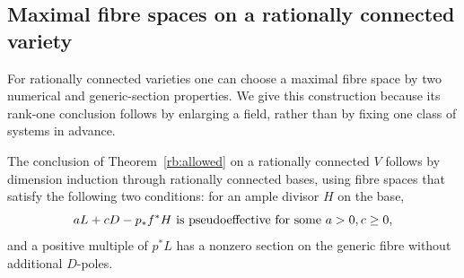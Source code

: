 \subsection{Maximal fibre spaces on a rationally connected variety}
\label{rb:max-fibration}

For rationally connected varieties one can choose a maximal fibre
space by two numerical and generic-section properties.  We give this
construction because its rank-one conclusion follows by enlarging a
field, rather than by fixing one class of systems in advance.

\begin{proposition}\label{rb:rc-method}
The conclusion of Theorem~\ref{rb:allowed} on a rationally connected
$V$ follows by dimension induction through rationally connected
bases, using fibre spaces that satisfy the following two conditions:
for an ample divisor $H$ on the base,
\[
 aL+cD-p_*f^*H\ \hbox{is pseudoeffective for some }a>0,c\geq0,
\]
and a positive multiple of $p^*L$ has a nonzero section on the generic
fibre without additional $D$-poles.
\end{proposition}

